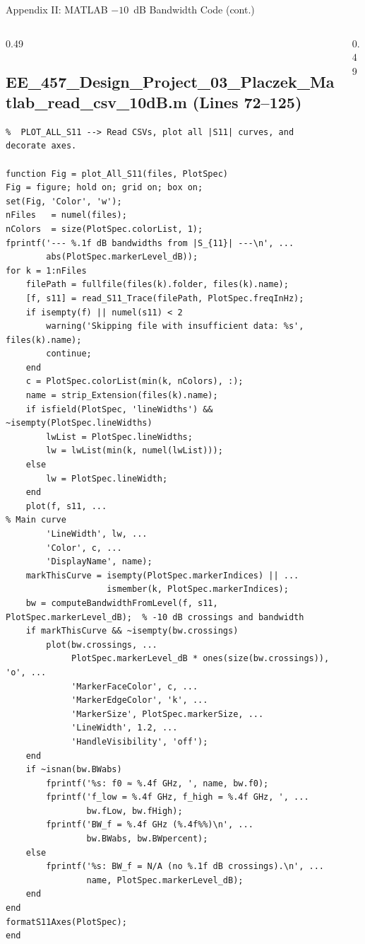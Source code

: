 \documentclass[compress,aspectratio=169,10pt]{beamer}
\begin{document}
\begin{frame}[fragile]{Appendix II: MATLAB $-10$~dB Bandwidth Code (cont.)}
    \begin{columns}[T]
        \begin{column}{0.49\textwidth}
\subsection[$-10$ dB code 3]{EE\_457\_Design\_Project\_03\_Placzek\_Matlab\_read\_csv\_10dB.m (Lines 72--125)}
            \begin{lstlisting}[firstnumber=72]
%% ------------------------------------------------------------------------
%  PLOT_ALL_S11 --> Read CSVs, plot all |S11| curves, and decorate axes.

function Fig = plot_All_S11(files, PlotSpec)
Fig = figure; hold on; grid on; box on;
set(Fig, 'Color', 'w');
nFiles   = numel(files);
nColors  = size(PlotSpec.colorList, 1);
fprintf('--- %.1f dB bandwidths from |S_{11}| ---\n', ...
        abs(PlotSpec.markerLevel_dB));
for k = 1:nFiles
    filePath = fullfile(files(k).folder, files(k).name);
    [f, s11] = read_S11_Trace(filePath, PlotSpec.freqInHz);
    if isempty(f) || numel(s11) < 2
        warning('Skipping file with insufficient data: %s', files(k).name);
        continue;
    end
    c = PlotSpec.colorList(min(k, nColors), :);
    name = strip_Extension(files(k).name);
    if isfield(PlotSpec, 'lineWidths') && ~isempty(PlotSpec.lineWidths)
        lwList = PlotSpec.lineWidths;
        lw = lwList(min(k, numel(lwList)));
    else
        lw = PlotSpec.lineWidth;
    end
    plot(f, s11, ...                                                  % Main curve
        'LineWidth', lw, ...
        'Color', c, ...
        'DisplayName', name);
    markThisCurve = isempty(PlotSpec.markerIndices) || ...
                    ismember(k, PlotSpec.markerIndices);
    bw = computeBandwidthFromLevel(f, s11, PlotSpec.markerLevel_dB);  % -10 dB crossings and bandwidth
    if markThisCurve && ~isempty(bw.crossings)
        plot(bw.crossings, ...
             PlotSpec.markerLevel_dB * ones(size(bw.crossings)), 'o', ...
             'MarkerFaceColor', c, ...
             'MarkerEdgeColor', 'k', ...
             'MarkerSize', PlotSpec.markerSize, ...
             'LineWidth', 1.2, ...
             'HandleVisibility', 'off');
    end
    if ~isnan(bw.BWabs)
        fprintf('%s: f0 ≈ %.4f GHz, ', name, bw.f0);
        fprintf('f_low = %.4f GHz, f_high = %.4f GHz, ', ...
                bw.fLow, bw.fHigh);
        fprintf('BW_f = %.4f GHz (%.4f%%)\n', ...
                bw.BWabs, bw.BWpercent);
    else
        fprintf('%s: BW_f = N/A (no %.1f dB crossings).\n', ...
                name, PlotSpec.markerLevel_dB);
    end
end
formatS11Axes(PlotSpec);
end
            \end{lstlisting}
        \end{column}
        \begin{column}{0.49\textwidth}

\end{column}
\end{columns}
\end{frame}
\end{document}
